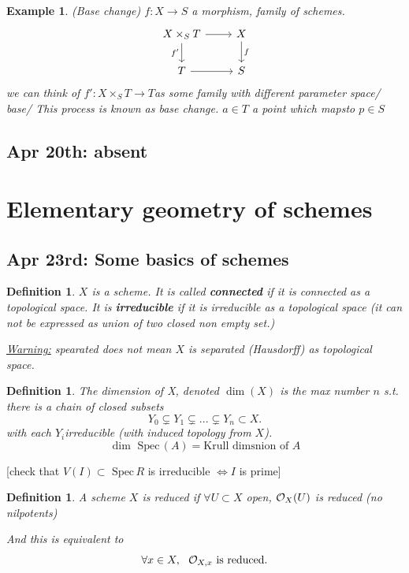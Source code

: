 \documentclass[11pt]{article}
\newtheorem{dfn}[thm]{Definition}
\newtheorem{ex}[thm]{Example}
\newcommand{\spec}{\text{ Spec}\,}
\newcommand{\calo}{{\cal O}}
\newcommand{\lrta}{\longrightarrow}
\newcommand{\Llrta}{\Longleftrightarrow}
\begin{document}
\begin{ex}
(Base change)
$f:X\lrta S$ a morphism, family of schemes.
$$
\begin{tikzcd}
X\times_S T \arrow[d, "f'"'] \arrow[r] & X \arrow[d, "f"] \\
T \arrow[r] & S
\end{tikzcd}
$$
 we can think of $f':X\times_{S}T\lrta T$as some family with different parameter space/ base/
 This process is known as base change. $a\in T$ a point which mapsto $p\in S$
\end{ex}
\subsection{Apr 20th: absent}

\section{Elementary geometry of schemes}
\subsection{Apr 23rd: Some basics of schemes}
\begin{dfn}
$X$ is a scheme. It is called \textbf{connected} if it is connected as a topological space. It is \textbf{irreducible} if it is irreducible as a topological space (it can not be expressed as union of two closed non empty set.)

\underline{Warning:} spearated does not mean $X$ is separated (Hausdorff) as topological space.
\end{dfn}
\begin{dfn}
The dimension of X, denoted $\dim(X)$ is the max number $n$ s.t. there is a chain of closed subsets
$$
Y_0\subsetneq Y_1\subsetneq ...\subsetneq Y_n \subset X.
$$ with each $Y_i$irreducible (with induced topology from $X$).
$$
\dim \spec (A)=\text{Krull dimsnion of $A$}
$$ 
\end{dfn}
[check that $V(I)\subset \spec R$ is irreducible $\Llrta I$ is prime] 

\begin{dfn}
A scheme $X$ is reduced if $\forall U\subset X$ open, $\calo_X(U)$ is reduced (no nilpotents)

And this is equivalent to 
$$
\forall x\in X,\ \  \calo_{X,x} \text{ is reduced.}
$$
\end{dfn}
\end{document}
